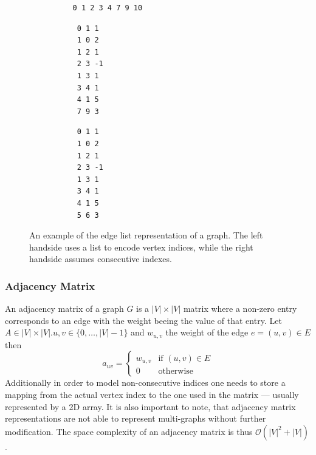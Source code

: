         \begin{figure}[htp]
         \begin{center}
         \begin{minipage}{0.5\textwidth}
         \begin{verbatim}
          0 1 2 3 4 7 9 10
          \end{verbatim}
          \begin{verbatim}
           0 1 1
           1 0 2
           1 2 1
           2 3 -1
           1 3 1
           3 4 1
           4 1 5
           7 9 3
          \end{verbatim}
         \end{minipage}%
         \hfill%
         \begin{minipage}{0.5\textwidth}
          \begin{verbatim}
           0 1 1
           1 0 2
           1 2 1
           2 3 -1
           1 3 1
           3 4 1
           4 1 5
           5 6 3
          \end{verbatim}
         \end{minipage}
         \end{center}
         \caption{%
             An example of the edge list representation of a graph.%
             The left handside uses a list to encode vertex indices, while the right handside assumes consecutive indexes.%
        }
        \label{edgelist}
        \end{figure}

        \subsubsection*{Adjacency Matrix}
        An adjacency matrix of a graph $G$ is a $|V|\times|V|$ matrix where a non-zero entry corresponds to an edge with the weight beeing the value of that entry. 
        Let $A \in |V|\times|V|. u, v \in \{0, \dots, |V| - 1\}$ and $w_{u,v}$ the weight of the edge $e = (u,v) \in E$ then
        \[ a_{uv} = \begin{cases}
                     w_{u,v} & \text{if } (u,v) \in E \\
                     0 & \text{otherwise}
                    \end{cases}
        \]
        Additionally in order to model non-consecutive indices one needs to store a mapping from the actual vertex index to the one used in the matrix --- usually represented by a 2D array. 
        It is also important to note, that adjacency matrix representations are not able to represent multi-graphs without further modification.
        The space complexity of an adjacency matrix is thus $\mathcal{O}(|V|^2 + |V|)$. \\
                
